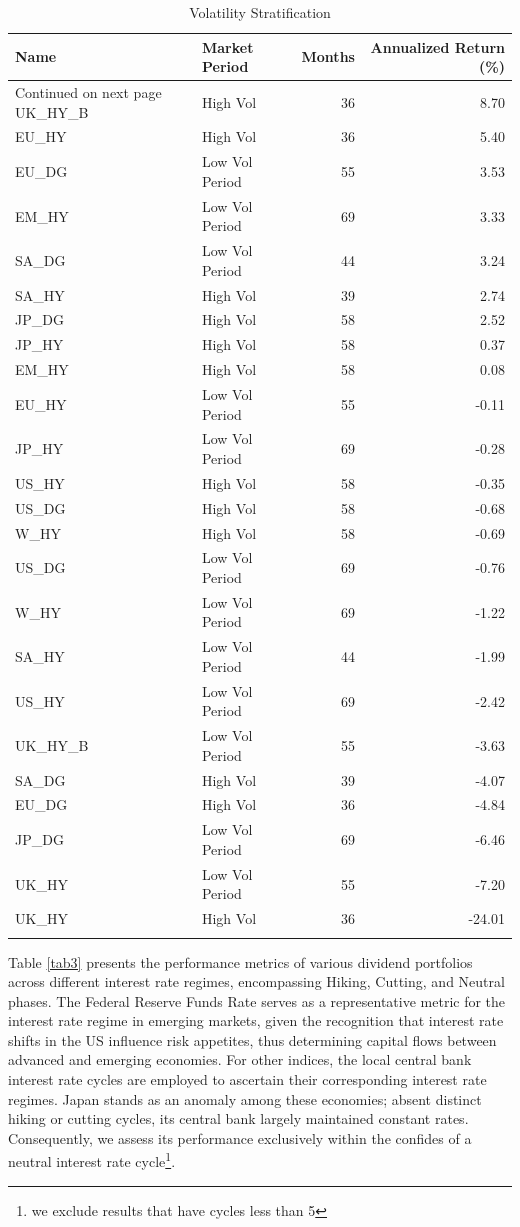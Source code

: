 \documentclass[10pt,preprint, authoryear]{elsarticle}
\numberwithin{equation}{section}
\numberwithin{figure}{section}
\numberwithin{table}{section}
\let\rmarkdownfootnote\footnote%
\def\footnote{\protect\rmarkdownfootnote}
\begin{document}
\begingroup\fontsize{12pt}{13pt}\selectfont
\begin{longtable}{llrr}
  \toprule
Name & Market Period & Months & Annualized Return (\%) \\ 
  \hline 
\endhead 
\hline 
{\footnotesize Continued on next page} 
\endfoot 
\endlastfoot 
 \midrule
UK\_HY\_B & High Vol &  36 & 8.70 \\ 
  EU\_HY & High Vol &  36 & 5.40 \\ 
  EU\_DG & Low Vol Period &  55 & 3.53 \\ 
  EM\_HY & Low Vol Period &  69 & 3.33 \\ 
  SA\_DG & Low Vol Period &  44 & 3.24 \\ 
  SA\_HY & High Vol &  39 & 2.74 \\ 
  JP\_DG & High Vol &  58 & 2.52 \\ 
  JP\_HY & High Vol &  58 & 0.37 \\ 
  EM\_HY & High Vol &  58 & 0.08 \\ 
  EU\_HY & Low Vol Period &  55 & -0.11 \\ 
  JP\_HY & Low Vol Period &  69 & -0.28 \\ 
  US\_HY & High Vol &  58 & -0.35 \\ 
  US\_DG & High Vol &  58 & -0.68 \\ 
  W\_HY & High Vol &  58 & -0.69 \\ 
  US\_DG & Low Vol Period &  69 & -0.76 \\ 
  W\_HY & Low Vol Period &  69 & -1.22 \\ 
  SA\_HY & Low Vol Period &  44 & -1.99 \\ 
  US\_HY & Low Vol Period &  69 & -2.42 \\ 
  UK\_HY\_B & Low Vol Period &  55 & -3.63 \\ 
  SA\_DG & High Vol &  39 & -4.07 \\ 
  EU\_DG & High Vol &  36 & -4.84 \\ 
  JP\_DG & Low Vol Period &  69 & -6.46 \\ 
  UK\_HY & Low Vol Period &  55 & -7.20 \\ 
  UK\_HY & High Vol &  36 & -24.01 \\ 
   \bottomrule
\caption{Volatility Stratification\label{tab2}} 
\end{longtable}
\endgroup

Table \ref{tab3} presents the performance metrics of various dividend
portfolios across different interest rate regimes, encompassing Hiking,
Cutting, and Neutral phases. The Federal Reserve Funds Rate serves as a
representative metric for the interest rate regime in emerging markets,
given the recognition that interest rate shifts in the US influence risk
appetites, thus determining capital flows between advanced and emerging
economies. For other indices, the local central bank interest rate
cycles are employed to ascertain their corresponding interest rate
regimes. Japan stands as an anomaly among these economies; absent
distinct hiking or cutting cycles, its central bank largely maintained
constant rates. Consequently, we assess its performance exclusively
within the confides of a neutral interest rate cycle\footnote{we exclude
  results that have cycles less than 5}.
\end{document}
